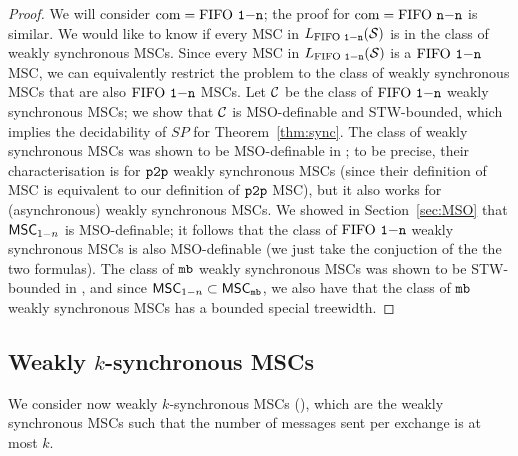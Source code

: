 \begin{proof}

	We will consider $\textup{com} = \text{FIFO } \mathtt{1\mathsf{-}n}$; the proof for $\textup{com} = \text{FIFO } \mathtt{n\mathsf{-}n}$ is similar. We would like to know if every MSC in $L_{\text{FIFO } \mathtt{1\mathsf{-}n}}(\mathcal{S})$ is in the class of weakly synchronous MSCs. Since every MSC in $L_{\text{FIFO } \mathtt{1\mathsf{-}n}}(\mathcal{S})$ is a $\text{FIFO } \mathtt{1\mathsf{-}n}$ MSC, we can equivalently restrict the problem to the class of weakly synchronous MSCs that are also $\text{FIFO } \mathtt{1\mathsf{-}n}$ MSCs. Let $\mathcal{C}$ be the class of $\text{FIFO } \mathtt{1\mathsf{-}n}$ weakly synchronous MSCs; we show that $\mathcal{C}$ is MSO-definable and STW-bounded, which implies the decidability of $SP$ for Theorem~\ref{thm:sync}. The class of weakly synchronous MSCs was shown to be MSO-definable in \cite{BolligGFLLS21}; to be precise, their characterisation is for $\mathtt{p2p}$ weakly synchronous MSCs (since their definition of MSC is equivalent to our definition of $\mathtt{p2p}$ MSC), but it also works for (asynchronous) weakly synchronous MSCs. We showed in Section~\ref{sec:MSO} that $\mathsf{MSC}_{1\mathsf{-}n}$ is MSO-definable; it follows that the class of $\text{FIFO } \mathtt{1\mathsf{-}n}$ weakly synchronous MSCs is also MSO-definable (we just take the conjuction of the the two formulas). The class of $\mathtt{mb}$ weakly synchronous MSCs was shown to be STW-bounded in \cite{BolligGFLLS21}, and since $\mathsf{MSC}_{1\mathsf{-}n} \subset \mathsf{MSC}_{\mathtt{mb}}$, we also have that the class of $\mathtt{mb}$ weakly synchronous MSCs has a bounded special treewidth. 
\end{proof}

\subsection{Weakly \texorpdfstring{$k$}{k}-synchronous MSCs}

We consider now weakly $k$-synchronous MSCs (\cite{BolligGFLLS21}), which are the weakly synchronous MSCs such that the number of messages sent per exchange is at most $k$.

